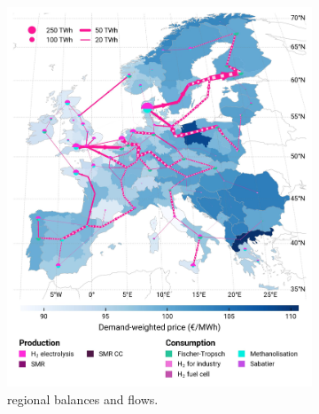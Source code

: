 \documentclass[final,5p,times,twocolumn,sort&compress]{elsarticle}
\begin{document}
\begin{figure}[htbp]
  \centering
  \begin{subfigure}[t]{0.49\textwidth}
      \vspace{0pt}
      \includegraphics[width=1\textwidth]{maps/pcipmi-national-international-expansion/base_s_adm___2040-balance_map_H2}
      \vspace{-0.5cm}
      \caption{ regional balances and flows.}
      \label{fig:PCI-in_lt_2040_h2}
  \end{subfigure}
  \hfill
  \begin{subfigure}[t]{0.49\textwidth}
      \vspace{0pt}

\end{subfigure}
\end{figure}
\end{document}
